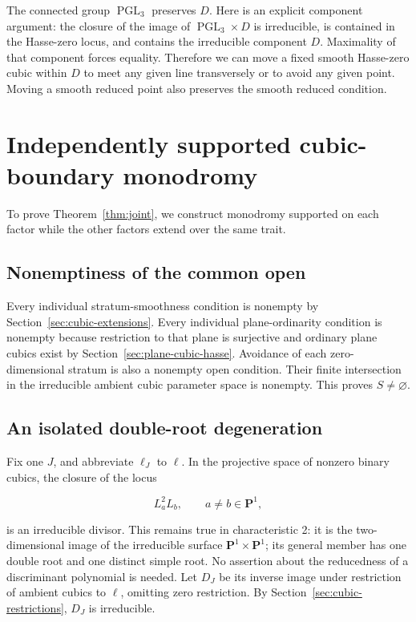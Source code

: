 \documentclass[11pt]{article}
\begin{document}
The connected group \(\operatorname{PGL}_3\) preserves \(D\). Here is an explicit component argument: the closure of the image of \(\operatorname{PGL}_3\times D\) is irreducible, is contained in the Hasse-zero locus, and contains the irreducible component \(D\). Maximality of that component forces equality. Therefore we can move a fixed smooth Hasse-zero cubic within \(D\) to meet any given line transversely or to avoid any given point. Moving a smooth reduced point also preserves the smooth reduced condition.

\section{Independently supported cubic-boundary monodromy}\label{sec:cubic-joint}
To prove Theorem~\ref{thm:joint}, we construct monodromy supported on each factor while the other factors extend over the same trait.


\subsection{Nonemptiness of the common open}\label{sec:cubic-open}

Every individual stratum-smoothness condition is nonempty by Section~\ref{sec:cubic-extensions}. Every individual plane-ordinarity condition is nonempty because restriction to that plane is surjective and ordinary plane cubics exist by Section~\ref{sec:plane-cubic-hasse}. Avoidance of each zero-dimensional stratum is also a nonempty open condition. Their finite intersection in the irreducible ambient cubic parameter space is nonempty. This proves \(S\ne\varnothing\).

\subsection{An isolated double-root degeneration}\label{sec:cubic-node-degeneration}

Fix one \(J\), and abbreviate \(\ell_J\) to \(\ell\). In the projective space of nonzero binary cubics, the closure of the locus

\[
L_a^2L_b,\qquad a\ne b\in\mathbf P^1,
\]

is an irreducible divisor. This remains true in characteristic 2: it is the two-dimensional image of the irreducible surface \(\mathbf P^1\times\mathbf P^1\); its general member has one double root and one distinct simple root. No assertion about the reducedness of a discriminant polynomial is needed. Let \(D_J\) be its inverse image under restriction of ambient cubics to \(\ell\), omitting zero restriction. By Section~\ref{sec:cubic-restrictions}, \(D_J\) is irreducible.
\end{document}
